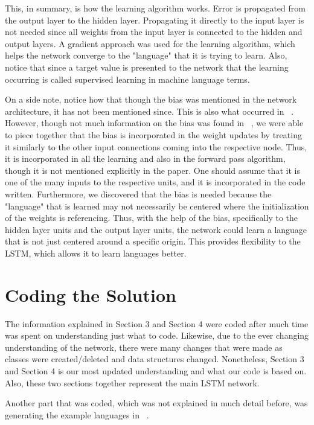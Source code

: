 \documentclass[11pt,letterpaper]{article}
\begin{document}
This, in summary, is how the learning algorithm works. Error is propagated from the output layer to the hidden layer. Propagating it directly to the input layer is not needed since all weights from the input layer is connected to the hidden and output layers. A gradient approach was used for the learning algorithm, which helps the network converge to the "language" that it is trying to learn. Also, notice that since a target value is presented to the network that the learning occurring is called supervised learning in machine language terms.

On a side note, notice how that though the bias was mentioned in the network architecture, it has not been mentioned since. This is also what occurred in ~\cite{Gers:01}. However, though not much information on the bias was found in ~\cite{Gers:01}, we were able to piece together that the bias is incorporated in the weight updates by treating it similarly to the other input connections coming into the respective node. Thus, it is incorporated in all the learning and also in the forward pass algorithm, though it is not mentioned explicitly in the paper. One should assume that it is one of the many inputs to the respective units, and it is incorporated in the code written. Furthermore, we discovered that the bias is needed because the "language" that is learned may not necessarily be centered where the initialization of the weights is referencing. Thus, with the help of the bias, specifically to the hidden layer units and the output layer units, the network could learn a language that is not just centered around a specific origin. This provides flexibility to the LSTM, which allows it to learn languages better. 
 
\section{Coding the Solution}
The information explained in Section 3 and Section 4 were coded after much time was spent on understanding just what to code. Likewise, due to the ever changing understanding of the network, there were many changes that were made as classes were created/deleted and data structures changed. Nonetheless, Section 3 and Section 4 is our most updated understanding and what our code is based on. Also, these two sections together represent the main LSTM network. 

Another part that was coded, which was not explained in much detail before, was generating the example languages in ~\cite{Gers:01}.
 
\end{document}
